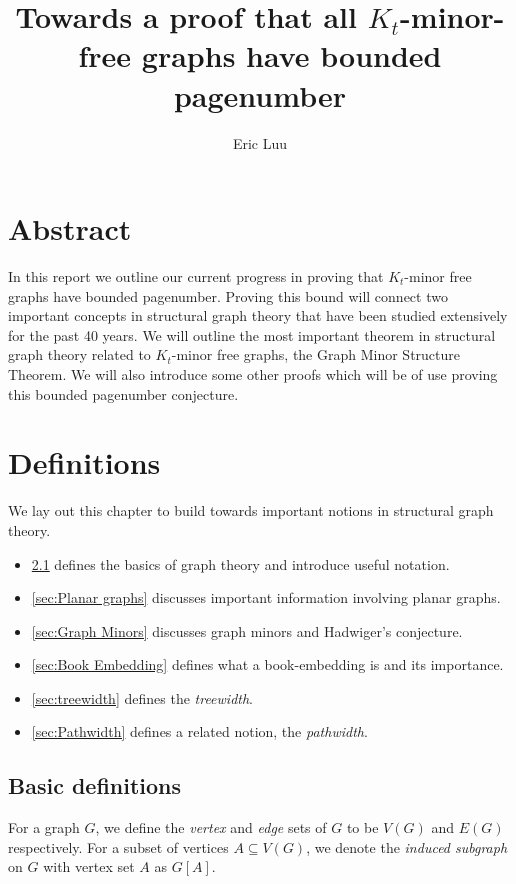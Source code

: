 \documentclass[]{report}
\title{Towards a proof that all $K_t$-minor-free graphs have bounded pagenumber}
\author{Eric Luu}
\theoremstyle{definition}
\numberwithin{theorem}{section}
\numberwithin{equation}{section}
\begin{document}
\maketitle
\chapter{Abstract}\label{abstract}
In this report we outline our current progress in proving that $K_t$-minor free graphs have bounded pagenumber. Proving this bound will connect two important concepts in structural graph theory that have been studied extensively for the past 40 years. We will outline the most important theorem in structural graph theory related to $K_t$-minor free graphs, the Graph Minor Structure Theorem. We will also introduce some other proofs which will be of use proving this bounded pagenumber conjecture. 



\chapter{Definitions}\label{chap:Definitions}
We lay out this chapter to build towards important notions in structural graph theory.

\begin{itemize}
	\item \cref{sec: Basic definitions} defines the basics of graph theory and introduce useful notation.
	\item \cref{sec:Planar graphs} discusses important information involving planar graphs. 
	\item \cref{sec:Graph Minors} discusses graph minors and Hadwiger's conjecture.
	\item \cref{sec:Book Embedding} defines what a book-embedding is and its importance. 
	\item \cref{sec:treewidth} defines the \textit{treewidth}.
	\item \cref{sec:Pathwidth} defines a related notion, the \textit{pathwidth}.
\end{itemize}
\section{Basic definitions}\label{sec: Basic definitions}
For a graph $G$, we define the \textit{vertex} and \textit{edge} sets of $G$ to be $V(G)$ and $E(G)$ respectively.
For a subset of vertices $A \subseteq V(G)$, we denote the \textit{induced subgraph} on $G$ with vertex set $A$ as $G[A]$. 
\end{document}
